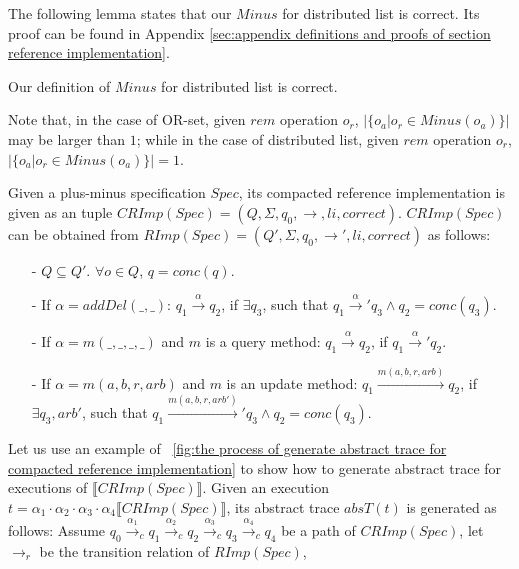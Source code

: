The following lemma states that our $Minus$ for distributed list is correct. Its proof can be found in Appendix \ref{sec:appendix definitions and proofs of section reference implementation}.

\begin{lemma}
\label{lemma:Minus for distributed list is correct}
Our definition of $Minus$ for distributed list is correct.
\end{lemma}

Note that, in the case of OR-set, given $rem$ operation $o_r$, $\vert \{ o_a \vert o_r \in Minus(o_a) \} \vert$ may be larger than $1$; while in the case of distributed list, given $rem$ operation $o_r$, $\vert \{ o_a \vert o_r \in Minus(o_a) \} \vert = 1$.

Given a plus-minus specification $Spec$, its compacted reference implementation is given as an tuple $CRImp(Spec) = (Q,\Sigma,q_0,\rightarrow,li,correct)$. $CRImp(Spec)$ can be obtained from $RImp(Spec) = (Q',\Sigma,q_0,\rightarrow',li,correct)$ as follows:

\begin{itemize}
\setlength{\itemsep}{0.5pt}
\item[-] $Q \subseteq Q'$. $\forall o \in Q$, $q = conc(q)$.

\item[-] If $\alpha = addDel(\_,\_)$: $q_1 {\xrightarrow{\alpha}} q_2$, if $\exists q_3$, such that $q_1 {\xrightarrow{\alpha}}' q_3 \wedge q_2 = conc(q_3)$.

\item[-] If $\alpha=m(\_,\_,\_,\_)$ and $m$ is a query method: $q_1 {\xrightarrow{\alpha}} q_2$, if $q_1 {\xrightarrow{\alpha}}' q_2$.

\item[-] If $\alpha=m(a,b,r,arb)$ and $m$ is an update method: $q_1 {\xrightarrow{m(a,b,r,arb)}} q_2$, if $\exists q_3,arb'$, such that $q_1 {\xrightarrow{m(a,b,r,arb')}}' q_3 \wedge q_2 = conc(q_3)$.
\end{itemize}

Let us use an example of \figurename~\ref{fig:the process of generate abstract trace for compacted reference implementation} to show how to generate abstract trace for executions of $\llbracket CRImp(Spec) \rrbracket$. Given an execution $t = \alpha_1 \cdot \alpha_2 \cdot \alpha_3 \cdot \alpha_4 \llbracket CRImp(Spec) \rrbracket$, its abstract trace $absT(t)$ is generated as follows: Assume $q_0 {\xrightarrow{\alpha_1}}_c q_1 {\xrightarrow{\alpha_2}}_c q_2 {\xrightarrow{\alpha_3}}_c q_3 {\xrightarrow{\alpha_4}}_c q_4$ be a path of $CRImp(Spec)$, let $\rightarrow_r$ be the transition relation of $RImp(Spec)$,

